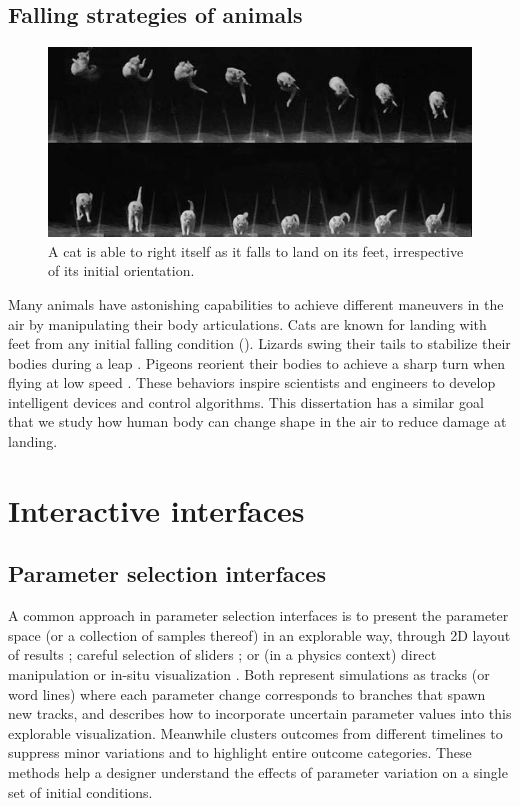 \subsection{Falling strategies of animals}
\begin{figure}[htbp]
\center
  \includegraphics[width=\linewidth]{images/related_cat.jpg}
  \caption{A cat is able to right itself as it falls to land on 
  its feet, irrespective of its initial orientation.}
 \label{fig:related_cat}
\end{figure}

Many animals have astonishing capabilities to achieve different
maneuvers in the air by manipulating their body articulations.  Cats
are known for landing with feet from any initial falling condition
\cite{Kane:1969:DEF,Montgomery:1993:GTF,Cat:2015:URL}
(). Lizards swing their tails to
stabilize their bodies during a leap \cite{Libby:2012:TAP}. Pigeons
reorient their bodies to achieve a sharp turn when flying at low speed
\cite{Ros:2011:PSL}. These behaviors inspire scientists and engineers
to develop intelligent devices and control algorithms. This dissertation has a
similar goal that we study how human body can change shape in the
air to reduce damage at landing.

\section{Interactive interfaces}
\label{sec:related_hitl}

\subsection{Parameter selection interfaces}
A common approach in parameter selection interfaces is 
to present the parameter space (or a collection of samples thereof) in an explorable way,
through 2D layout of results \cite{Marks:1997:DGA};
careful selection of sliders \cite{Ovsjanikov:2011:Shapes,Lindow:2012:PLP};
or (in a physics context) direct manipulation \cite{Popovic:2000:IMR}
or in-situ visualization \cite{Twigg:2007:MWB}.
Both \cite{WFR:2010:WL,WFR:2011:NOR} represent simulations as tracks (or word lines) 
where each parameter change corresponds to branches that spawn new tracks, and 
\cite{WFR:2010:WL} describes how to incorporate uncertain parameter values into this explorable visualization.  
Meanwhile \cite{BM:2010:RDE} clusters outcomes from different timelines to suppress minor variations and to highlight entire outcome categories. 
These methods help a designer understand the effects of parameter variation 
on a single set of initial conditions.

